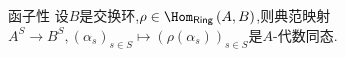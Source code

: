 \begin{proposition}{函子性}{}
	设$B$是交换环,$\rho\in\Hom_{\mathsf{Ring}}\left(A,B\right)$,则典范映射$A^{S}\to B^{S},\left(\alpha_{s}\right)_{s\in S}\mapsto\left(\rho\left(\alpha_{s}\right)\right)_{s\in S}$是$A$-代数同态.
\end{proposition}











































































